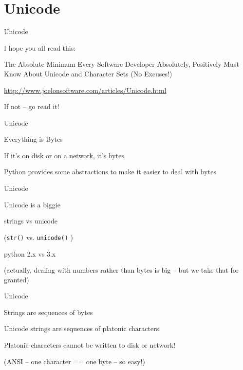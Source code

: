 \documentclass{beamer}
\begin{document}
\section{Unicode}

\begin{frame}[fragile]{Unicode}

{\Large I hope you all read this:}

\vfill
{\Large
\centering
The Absolute Minimum Every Software Developer Absolutely,
Positively Must Know About Unicode and Character Sets (No Excuses!)

}

\vfill
\url{http://www.joelonsoftware.com/articles/Unicode.html}

\vfill
{\Large If not -- go read it!}

\end{frame}

\begin{frame}[fragile]{Unicode}

{\Large
\vfill

Everything is Bytes

\vfill
If it's on disk or on a network, it's bytes

\vfill
Python provides some abstractions to make it easier to deal with bytes

\vfill
}

\end{frame}

\begin{frame}[fragile]{Unicode}

{\Large
\vfill

Unicode is a biggie

\vfill
strings vs unicode 
}

{\large (\verb|str()| vs. \verb|unicode()| ) }

\vfill
{\Large python 2.x vs 3.x}


\vfill
(actually, dealing with numbers rather than bytes is big -- but we take that for granted)

\end{frame}

\begin{frame}[fragile]{Unicode}

{\Large
\vfill
Strings are sequences of bytes

\vfill
Unicode strings are sequences of platonic characters

\vfill
Platonic characters cannot be written to disk or network!
}
\vfill
(ANSI -- one character == one byte -- so easy!)
\end{frame}
\end{document}
